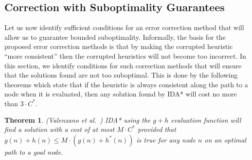 \documentclass[letterpaper]{article}
\newtheorem{theorem}{Theorem}
\newtheorem{definition}{Definition}
\begin{document}


\subsection{Correction with Suboptimality Guarantees}

Let us now identify sufficient conditions for an error correction method that will allow us to guarantee bounded suboptimality.
Informally, the basis for the proposed error correction methods is that by making the corrupted heuristic ``more consistent'' then the corrupted heuristics will not become too incorrect.
In this section, we identify conditions for such correction methods that will ensure that the solutions found are not too suboptimal.
This is done by the following theorems which state that if the heuristic is always consistent along the path to a node when it is evaluated, then any solution found by IDA* will cost no more than $3 \cdot C^*$. 


\begin{theorem} (Valenzano et al.~)
IDA* using the $g+h$ evaluation function will find a solution with a cost of at most $M\cdot C^*$ provided that $g(n) + h(n) \leq M \cdot (g(n)+h^*(n))$ is true for any node $n$ on an optimal path to a goal node. %
\label{theorem:rickmas}
\end{theorem}
\end{document}

